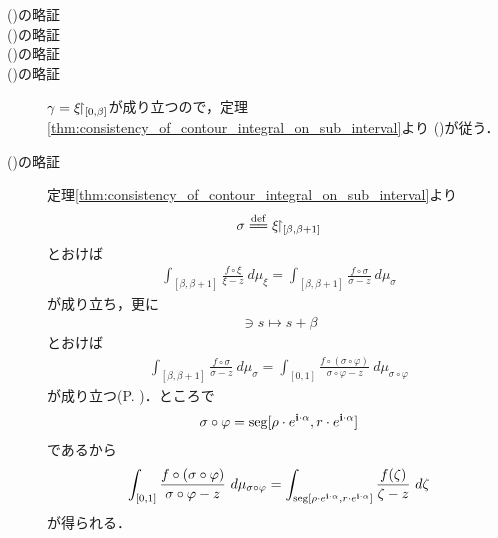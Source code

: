 	\begin{description}
		\item[()の略証]
		\item[()の略証]
		\item[()の略証]
		\item[()の略証]
			$\gamma = \xi\hspace{-0.41em}\upharpoonright_{[0,\beta]}$が成り立つので，定理\ref{thm:consistency_of_contour_integral_on_sub_interval}より
			()が従う．
			
		\item[()の略証]
			定理\ref{thm:consistency_of_contour_integral_on_sub_interval}より
			\begin{align}
				\sigma \defeq \rest{\xi}{[\beta,\beta+1]}
			\end{align}
			とおけば
			\begin{align}
				\int_{[\beta,\beta+1]} \frac{f \circ \xi}{\xi - z}\ d\mu_{\xi}
				= \int_{[\beta,\beta+1]} \frac{f \circ \sigma}{\sigma - z}\ d\mu_{\sigma}
			\end{align}
			が成り立ち，更に
			\begin{align}
				[0,1] \ni s \longmapsto s + \beta
			\end{align}
			とおけば
			\begin{align}
				\int_{[\beta,\beta+1]} \frac{f \circ \sigma}{\sigma - z}\ d\mu_{\sigma}
				= \int_{[0,1]} \frac{f \circ (\sigma \circ \varphi)}{\sigma \circ \varphi - z}\ d\mu_{\sigma \circ \varphi}
			\end{align}
			が成り立つ(P. \pageref{fom:change_of_parameter_interval_complex_contour_integral})．ところで
			\begin{align}
				\sigma \circ \varphi = \operatorname{seg}[\rho \cdot e^{\mathbf{i} \cdot \alpha},r \cdot e^{\mathbf{i} \cdot \alpha}]
			\end{align}
			であるから
			\begin{align}
				\int_{[0,1]} \frac{f \circ (\sigma \circ \varphi)}{\sigma \circ \varphi - z}\ d\mu_{\sigma \circ \varphi}
				= \int_{\operatorname{seg}[\rho \cdot e^{\mathbf{i} \cdot \alpha},r \cdot e^{\mathbf{i} \cdot \alpha}]} \frac{f(\zeta)}{\zeta - z}\ d\zeta
			\end{align}
			が得られる．
		

\end{description}
